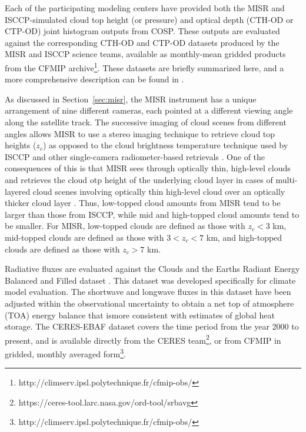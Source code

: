 Each of the participating modeling centers have provided both the MISR
and ISCCP-simulated cloud top height (or pressure) and optical depth
(CTH-OD or CTP-OD) joint histogram outputs from COSP. These outputs are
evaluated against the corresponding CTH-OD and CTP-OD datasets produced
by the MISR and ISCCP science teams, available as monthly-mean gridded
products from the CFMIP archive\footnote{http://climserv.ipsl.polytechnique.fr/cfmip-obs/}.
These datasets are briefly summarized here, and a more comprehensive
description can be found in \citet{marchand_et_al_2010}.

As discussed in Section~\ref{sec:misr}, the MISR instrument has a unique
arrangement of nine different cameras, each pointed at a different
viewing angle along the satellite track. The successive imaging of cloud
scenes from different angles allows MISR to use a stereo imaging
technique to retrieve cloud top heights (\(z_c\)) as opposed to the
cloud brightness temperature technique used by ISCCP and other
single-camera radiometer-based retrievals
\citep{moroney_et_al_2002, muller_et_al_2002}. One of the consequences
of this is that MISR sees through optically thin, high-level clouds and
retrieves the cloud otp height of the underlying cloud layer in cases of
multi-layered cloud scenes involving optically thin high-level cloud
over an optically thicker cloud layer \citep{marchand_et_al_2010}. Thus,
low-topped cloud amounts from MISR tend to be larger than those from
ISCCP, while mid and high-topped cloud amounts tend to be smaller. For
MISR, low-topped clouds are defined as those with \(z_c < 3\) km,
mid-topped clouds are defined as those with \(3 < z_c < 7\) km, and
high-topped clouds are defined as those with \(z_c > 7\) km.

Radiative fluxes are evaluated against the Clouds and the Earths Radiant
Energy Balanced and Filled dataset \citep[CERES-EBAF Version
2.6;][]{loeb_et_al_2009}. This dataset was developed specifically for
climate model evaluation. The shortwave and longwave fluxes in this
dataset have been adjusted within the observational uncertainty to
obtain a net top of atmosphere (TOA) energy balance that ismore
consistent with estimates of global heat storage. The CERES-EBAF dataset
covers the time period from the year 2000 to present, and is available
directly from the CERES team\footnote{https://ceres-tool.larc.nasa.gov/ord-tool/srbavg},
or from CFMIP in gridded, monthly averaged form\footnote{http://climserv.ipsl.polytechnique.fr/cfmip-obs/}.

